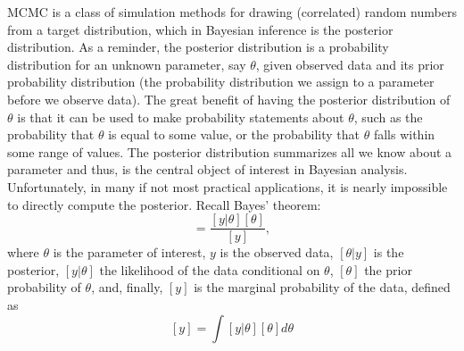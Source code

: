 MCMC is a class of simulation methods for
drawing (correlated) random numbers from a target distribution, which
in Bayesian inference is the posterior distribution.
As a reminder, the posterior distribution is a probability
distribution for an unknown parameter, say $\theta$, given
observed data and its prior probability distribution (the probability
distribution we assign to a parameter before we observe data).  The
great benefit of having the posterior distribution of $\theta$ is
that it can be used to make probability statements about $\theta$,
such as the probability that $\theta$ is equal to some value, or the
probability that $\theta$ falls within some range of values.
The posterior distribution summarizes all we know about a parameter
and thus, is the central object of interest in Bayesian
analysis. Unfortunately, in many if not most practical applications,
it is nearly impossible to directly compute the posterior. Recall
Bayes' theorem:
\begin{equation}
[\theta|y] = \frac{[y|\theta] [\theta]}  {[y]},
\label{mcmc.eq.bayes}
\end{equation}
where $\theta$ is the parameter of interest, $y$ is the observed data,
$[\theta|y]$ is the posterior, $[y|\theta]$ the likelihood of the
data conditional on $\theta$, $[\theta]$ the prior probability of
$\theta$, and, finally, $[y]$ is the marginal probability of the
data, defined as
\[
[y] = \int [y|\theta]  [\theta] d\theta
\]

